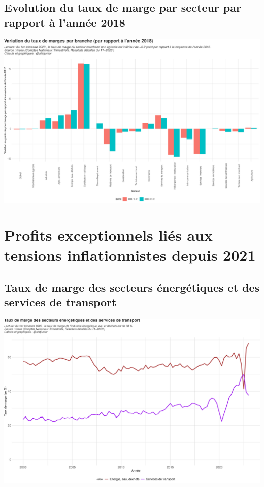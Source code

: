 \documentclass[
  paper=a4,
  ,captions=tableheading
]{scrartcl}
\begin{document}
\hypertarget{evolution-du-taux-de-marge-par-secteur-par-rapport-uxe0-lannuxe9e-2018}{%
\subsection{Evolution du taux de marge par secteur par rapport à l'année
2018}\label{evolution-du-taux-de-marge-par-secteur-par-rapport-uxe0-lannuxe9e-2018}}

\includegraphics{rapport_pdf_compte_branche_files/figure-latex/unnamed-chunk-28-1.pdf}

\newpage

\hypertarget{profits-exceptionnels-liuxe9s-aux-tensions-inflationnistes-depuis-2021}{%
\section{Profits exceptionnels liés aux tensions inflationnistes depuis
2021}\label{profits-exceptionnels-liuxe9s-aux-tensions-inflationnistes-depuis-2021}}

\hypertarget{taux-de-marge-des-secteurs-uxe9nerguxe9tiques-et-des-services-de-transport}{%
\subsection{Taux de marge des secteurs énergétiques et des services de
transport}\label{taux-de-marge-des-secteurs-uxe9nerguxe9tiques-et-des-services-de-transport}}

\includegraphics{rapport_pdf_compte_branche_files/figure-latex/unnamed-chunk-30-1.pdf}
\end{document}
